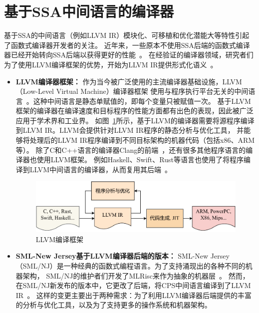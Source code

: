 \section{基于SSA中间语言的编译器} \label{sec:relatedssa}

基于SSA的中间语言（例如LLVM IR）模块化、可移植和优化潜能大等特性引起了函数式编译器开发者的关注。
近年来，一些原本不使用SSA后端的函数式编译器已经开始转向SSA后端以获得更好的性能~\cite{farvardin2020new}。
在经验证的编译器领域，研究者们为了使用LLVM编译框架的优势，开始为LLVM IR提供形式化语义~\cite{zhao2012formalizing}。

\begin{itemize}
    \item \textbf{LLVM编译器框架：} 
    作为当今被广泛使用的主流编译器基础设施，LLVM（Low-Level Virtual Machine）编译器框架
    使用与程序执行平台无关的中间语言~\cite{lattner2004llvm}。这种中间语言是静态单赋值的，即每个变量只被赋值一次。
    基于LLVM框架的编译器在编译速度和目标程序的性能方面都有出色的表现，因此被广泛应用于学术界和工业界。
    如图~\ref{fig:llvm}所示，基于LLVM的编译器需要将源程序编译到LLVM IR。LLVM会提供针对LLVM IR程序的静态分析与优化工具，
    并能够将处理后的LLVM IR程序编译到不同目标架构的机器代码（包括x86、ARM等）。
    除了C和C++语言的编译器Clang的前端~\cite{lattner2008llvm}，还有很多其他程序语言的编译器也使用LLVM框架。
    例如Haskell、Swift、Rust等语言也使用了将程序编译到LLVM中间语言的编译器，从而复用其后端~\cite{liu2013intel,zhang2012swift}。
    \begin{figure}[htbp]
        \centering
        \vspace{2ex}
        \includegraphics[width=0.8\linewidth]{figures/llvmst.pdf}
        \caption{LLVM编译框架}\label{fig:llvm}
    \end{figure}
    \item \textbf{SML-New Jersey基于LLVM编译器后端的版本：} 
    SML-New Jersey（SML/NJ）是一种经典的函数式编程语言。为了支持涌现出的各种不同的机器架构，
    SML/NJ的维护者们开发了MLRisc来作为抽象的机器层~\cite{george1994portable}。
    然而，在SML/NJ新发布的版本中，它更改了后端，将CPS中间语言编译到了LLVM IR~\cite{farvardin2020new}。
    这样的变更主要出于两种需求：为了利用LLVM编译器后端提供的丰富的分析与优化工具，以及为了支持更多的操作系统和机器架构。

\end{itemize}
